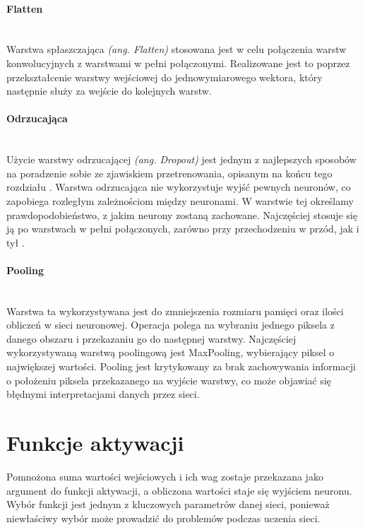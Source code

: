 \paragraph{Flatten} \mbox{}\\
Warstwa spłaszczająca \textit{(ang. Flatten)} stosowana jest w celu połączenia warstw
konwolucyjnych z warstwami w pełni połączonymi. Realizowane jest to poprzez przekształcenie
warstwy wejściowej do jednowymiarowego wektora, który następnie służy za wejście
do kolejnych warstw.

\paragraph{Odrzucająca} \mbox{}\\
Użycie warstwy odrzucającej \textit{(ang. Dropout)} jest jednym z najlepszych sposobów
na poradzenie sobie ze zjawiskiem przetrenowania, opisanym na końcu tego rozdziału
\cite{DropoutPreventOverfit}. Warstwa odrzucająca nie wykorzystuje wyjść pewnych neuronów,
co zapobiega rozległym zależnościom między neuronami. W warstwie tej określamy prawdopodobieństwo,
z jakim neurony zostaną zachowane. Najczęściej stosuje się ją po warstwach w pełni
połączonych, zarówno przy przechodzeniu w przód, jak i tył \cite{DropConnect}.

\paragraph{Pooling} \mbox{}\\
Warstwa ta wykorzystywana jest do zmniejszenia rozmiaru pamięci oraz ilości obliczeń
w sieci neuronowej. Operacja polega na wybraniu jednego piksela z danego obszaru i przekazaniu
go do następnej warstwy. Najczęściej wykorzystywaną warstwą poolingową jest MaxPooling, wybierający
piksel o największej wartości. Pooling jest krytykowany za brak zachowywania informacji
o położeniu piksela przekazanego na wyjście warstwy, co może objawiać się błędnymi
interpretacjami danych przez sieci.

\section{Funkcje aktywacji}

Pomnożona suma wartości wejściowych i ich wag zostaje przekazana
jako argument do funkcji aktywacji, a obliczona wartości staje się wyjściem neuronu.
Wybór funkcji jest jednym z kluczowych parametrów danej sieci, ponieważ niewłaściwy wybór
może prowadzić do problemów podczas uczenia sieci.

